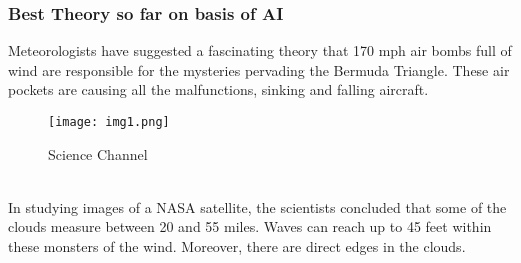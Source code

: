 \documentclass[12pt,a4paper]{article}
\begin{document}
\subsubsection*{Best Theory so far on basis of AI}
Meteorologists have suggested a fascinating theory that 170 mph air bombs full of wind are responsible for the mysteries pervading the Bermuda Triangle. These air pockets are causing all the malfunctions, sinking and falling aircraft.
\\
\begin{figure}[htp]
    \centering
    \texttt{[image: img1.png]}
    \caption{Science Channel}
    \label{fig:galaxy}
\end{figure}
\\
In studying images of a NASA satellite, the scientists concluded that some of the clouds measure between 20 and 55 miles. Waves can reach up to 45 feet within these monsters of the wind. Moreover, there are direct edges in the clouds.
\end{document}
